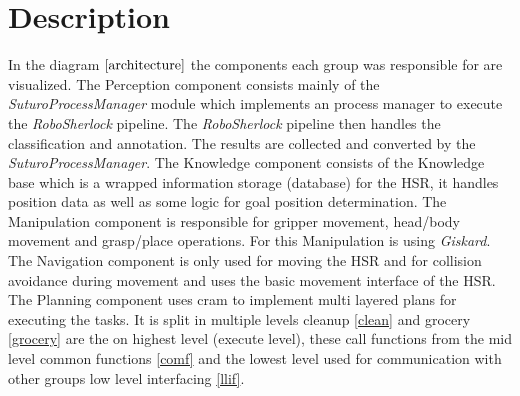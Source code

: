 \documentclass[main.tex]{subfiles}
\begin{document}
		\section{Description}
			In the diagram \(\ref{architecture}\) the components each group was responsible for are visualized. The Perception component consists mainly of the \textit{SuturoProcessManager} module which implements an process manager to execute the \textit{RoboSherlock} pipeline. The \textit{RoboSherlock} pipeline then handles the classification and annotation. The results are collected and converted by the \textit{SuturoProcessManager}.  The Knowledge component consists of the Knowledge base which is a wrapped information storage (database) for the HSR, it handles position data as well as some logic for goal position determination. The Manipulation component is responsible for gripper movement, head/body movement and grasp/place operations. For this Manipulation is using \textit{Giskard}. The Navigation component is only used for moving the HSR and for collision avoidance during movement and uses the basic movement interface of the HSR. The Planning component uses cram to implement multi layered plans for executing the tasks. It is split in multiple levels cleanup \ref{clean} and grocery \ref{grocery} are the on highest level (execute level), these call functions from the mid level common functions \ref{comf} and the lowest level used for communication with other groups low level interfacing \ref{llif}.
\end{document}
